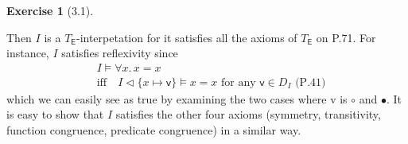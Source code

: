 \documentclass[12pt, psamsfonts]{amsart}
\theoremstyle{definition}
\newtheorem*{exer}{Exercise}
\theoremstyle{remark}
\numberwithin{equation}{subsection}
\begin{document}
\begin{exer}[3.1]
\begin{enumerate}[label=(\alph*)]
\begin{itemize}
            \end{itemize}
            Then $I$ is a $T_{\textsf{E}}$-interpetation for it satisfies all the axioms of $T_{\textsf{E}}$ on P.71.
            For instance, $I$ satisfies reflexivity since
            \begin{align*}
                &I \models \forall x.\, x = x \\
                &\text{iff}\quad I \vartriangleleft \{ x \mapsto \textsf{v} \} \models x = x \text{ for any $\textsf{v} \in D_I$ (P.41)}
            \end{align*}
            which we can easily see as \textsf{true} by examining the two cases where \textsf{v} is $\circ$ and $\bullet$.
            It is easy to show that $I$ satisfies the other four axioms (symmetry, transitivity, function congruence, predicate congruence) in a similar way.


\end{enumerate}
\end{exer}
\end{document}
